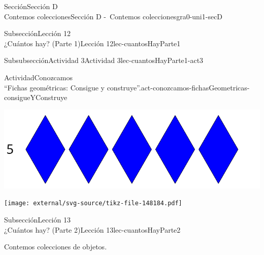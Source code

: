 \begin{sectionptx}{Sección}{{\Large Sección D\\}Contemos colecciones}{}{Sección D -~Contemos colecciones}{}{}{gra0-uni1-secD}
\begin{subsectionptx}{Subsección}{{\normalsize Lección 12\\[-0.05cm]}¿Cuántos hay? (Parte 1)}{}{Lección 12}{}{}{lec-cuantosHayParte1}
\typeout{************************************************}
\typeout{************************************************}
%
\begin{subsubsectionptx}{Subsubsección}{Actividad 3}{}{Actividad 3}{}{}{lec-cuantosHayParte1-act3}
\begin{activity}{Actividad}{Conozcamos\\“Fichas geométricas: Consigue y construye”.}{act-conozcamos-fichasGeometricas-consigueYConstruye}%
\begin{image}{0}{1}{0}{}%
\includegraphics[max width=\linewidth, center]{external/svg-source/tikz-file-148183.pdf}
\end{image}%
\begin{image}{0}{1}{0}{}%
\texttt{[image: external/svg-source/tikz-file-148184.pdf]}
\end{image}%
\end{activity}%
\end{subsubsectionptx}
\end{subsectionptx}
%
%
\typeout{************************************************}
\typeout{************************************************}
%
\begin{subsectionptx}{Subsección}{{\normalsize Lección 13\\[-0.05cm]}¿Cuántos hay? (Parte 2)}{}{Lección 13}{}{}{lec-cuantosHayParte2}
\begin{introduction}{}%
Contemos colecciones de objetos.%
\end{introduction}%
%
%
\typeout{************************************************}
\typeout{************************************************}
%

\end{subsectionptx}
\end{sectionptx}
